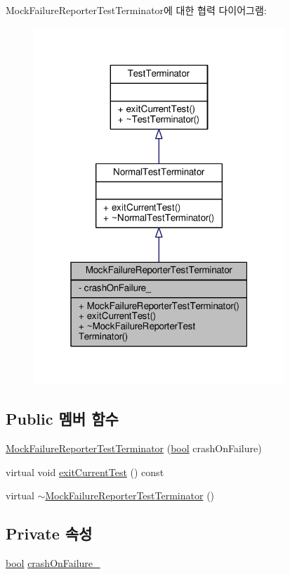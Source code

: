 Mock\+Failure\+Reporter\+Test\+Terminator에 대한 협력 다이어그램\+:
\nopagebreak
\begin{figure}[H]
\begin{center}
\leavevmode
\includegraphics[width=268pt]{class_mock_failure_reporter_test_terminator__coll__graph}
\end{center}
\end{figure}
\subsection*{Public 멤버 함수}
\begin{DoxyCompactItemize}
\item 
\hyperlink{class_mock_failure_reporter_test_terminator_a55af70a521d67195eadc4f3ff8872f20}{Mock\+Failure\+Reporter\+Test\+Terminator} (\hyperlink{avb__gptp_8h_af6a258d8f3ee5206d682d799316314b1}{bool} crash\+On\+Failure)
\item 
virtual void \hyperlink{class_mock_failure_reporter_test_terminator_a7f87c18375794ff3ed0f0141c9bd4bfd}{exit\+Current\+Test} () const 
\item 
virtual \hyperlink{class_mock_failure_reporter_test_terminator_a3830e602feafe45fbdc226e75ff7859c}{$\sim$\+Mock\+Failure\+Reporter\+Test\+Terminator} ()
\end{DoxyCompactItemize}
\subsection*{Private 속성}
\begin{DoxyCompactItemize}
\item 
\hyperlink{avb__gptp_8h_af6a258d8f3ee5206d682d799316314b1}{bool} \hyperlink{class_mock_failure_reporter_test_terminator_a9faf961cbe6687577f4eaae4625bcbea}{crash\+On\+Failure\+\_\+}
\end{DoxyCompactItemize}


